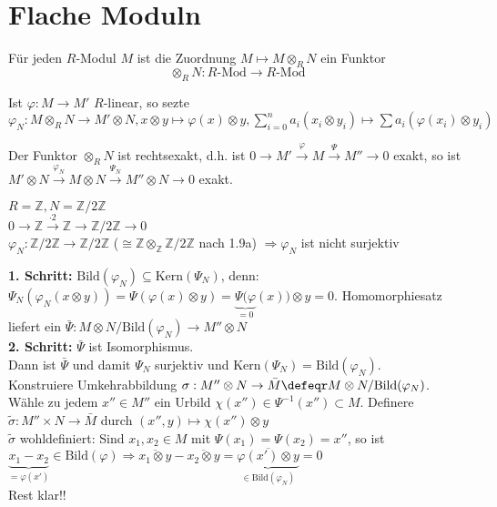 \section{Flache Moduln}

\begin{Bem}
  Für jeden $R$-Modul $M$ ist die Zuordnung $M \mapsto M \otimes_R N$ ein Funktor
  \[\otimes_R N: R\mbox{-Mod} \to R\mbox{-Mod}\]
\end{Bem}

\begin{Bew} 
  Ist $\varphi: M \to M'$ $R$-linear, so sezte $\varphi_N: M \otimes_R N \to M'
  \otimes N, x \otimes y \mapsto \varphi(x) \otimes y, \displaystyle
  \sum_{i=0}^na_i(x_i \otimes y_i) \mapsto \sum a_i(\varphi(x_i) \otimes y_i)$
\end{Bew}

\begin{Prop}
\label{1.12}
  Der Funktor $\otimes_R N$ ist rechtsexakt, d.h. ist $0 \to M'
  \overset{\varphi}{\to} M \overset{\Psi}{\to} M'' \to 0$ exakt, so ist $ M'
  \otimes N \overset{\varphi_N}{\to} M \otimes N \overset{\Psi_N}{\to} M'' \otimes N
  \to 0$ exakt.
\end{Prop}

\begin{nnBsp} 
  $R = \mathbb{Z}, N = \mathbb{Z}/2 \mathbb{Z}$\\
  $0 \to \mathbb{Z} \overset{ \cdot 2}{\to} \mathbb{Z} \to \mathbb{Z}/2
  \mathbb{Z} \to 0$\\
  $\varphi_N: \mathbb{Z}/2 \mathbb{Z} \to \mathbb{Z} / 2 \mathbb{Z}$ ($\cong
  \mathbb{Z} \otimes_{\mathbb{Z}} \mathbb{Z} / 2 \mathbb{Z}$ nach 1.9a)
  $\Rightarrow \varphi_N$ ist nicht surjektiv
\end{nnBsp}

\begin{Bew} 
  \textbf{1. Schritt:} $\mbox{Bild}(\varphi_N) \subseteq \mbox{Kern}(\Psi_N)$,
  denn: $\Psi_N(\varphi_N(x \otimes y)) = \Psi(\varphi(x) \otimes y) =
  \underset{=0}{\underbrace{\Psi(\varphi}}(x)) \otimes y = 0$. Homomorphiesatz
  liefert ein $\bar{\Psi}: M \otimes N/\mbox{Bild}(\varphi_N) \to M'' \otimes
  N$\\
  \textbf{2. Schritt:} $\bar{\Psi}$ ist Isomorphismus.\\
  Dann ist $\bar{\Psi}$ und damit $\Psi_N$ surjektiv und $\mbox{Kern}(\Psi_N) =
  \mbox{Bild}(\varphi_N)$.\\
  Konstruiere Umkehrabbildung $\sigma: M'' \otimes N \to \bar{M} \defeqr M
  \otimes N/\mbox{Bild}(\varphi_N)$. Wähle zu jedem $x'' \in M''$ ein Urbild
  $\chi(x'') \in \Psi^{-1}(x'') \subset M$.
  Definere $\tilde{\sigma}: M'' \times N \to \bar{M}$ durch $(x'', y) \mapsto
  \chi(x'') \otimes y$\\
  $\tilde{\sigma}$ wohldefiniert:
  Sind $x_1,x_2 \in M$ mit $\Psi(x_1) = \Psi(x_2) = x''$, so ist $\underset{= \varphi(x')
  }{\underbrace{x_1 - x_2}} \in \mbox{Bild}(\varphi) \Rightarrow \overline{x_1
  \otimes y} - \overline{x_2 \otimes y} = \underset{\in \mbox{Bild}(\varphi_N)
  }{\underbrace{\overline{\varphi(x') \otimes y}}} = 0$\\
  Rest klar!!
\end{Bew}

